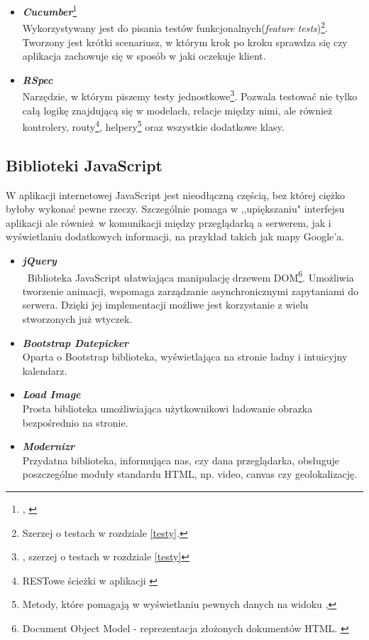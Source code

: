     \begin{itemize}
      \item \textbf{\emph{Cucumber}}\footnote{\cite{cucumber}, \cite{testing_tuesday} } \\
      Wykorzystywany jest do pisania testów funkcjonalnych(\emph{feature tests})\footnote{Szerzej o testach w rozdziale \ref{testy}.}. Tworzony jest krótki scenariusz, w którym krok po kroku sprawdza się czy aplikacja zachowuje się w sposób w jaki oczekuje klient.
      \item \textbf{\emph{RSpec}} \\
      Narzędzie, w którym piszemy testy jednostkowe\footnote{\cite{rspec}, szerzej o testach w rozdziale \ref{testy}}. Pozwala testować nie tylko całą logikę znajdującą się w modelach, relacje między nimi, ale również kontrolery, routy\footnote{RESTowe ścieżki w aplikacji \cite{head_first}}, helpery\footnote{Metody, które pomagają w wyświetlaniu pewnych danych na widoku \cite{rspec},\cite{rails_guide}} oraz wszystkie dodatkowe klasy. 
    \end{itemize}

  \subsection{Biblioteki JavaScript}
    W aplikacji internetowej JavaScript\cite{java_script} jest nieodłączną częścią, bez której ciężko byłoby wykonać pewne rzeczy. Szczególnie pomaga w ,,upiększaniu" interfejsu aplikacji ale również w komunikacji między przeglądarką a serwerem, jak i wyświetlaniu dodatkowych informacji, na przykład takich jak mapy Google'a.

    \begin{itemize}
      \item \textbf{\emph{jQuery}} \\ \
      Biblioteka JavaScript ułatwiająca manipulację drzewem DOM\footnote{Document Object Model - reprezentacja złożonych dokumentów HTML. \cite{html5_css3}}. Umożliwia tworzenie animacji, wspomaga zarządzanie asynchronicznymi zapytaniami do serwera. Dzięki jej implementacji możliwe jest korzystanie z wielu stworzonych już wtyczek.
      \item \textbf{\emph{Bootstrap Datepicker}} \\
      Oparta o Bootstrap biblioteka, wyświetlająca na stronie ładny i intuicyjny kalendarz.
      \item \textbf{\emph{Load Image}} \\
      Prosta biblioteka umożliwiająca użytkownikowi ładowanie obrazka bezpośrednio na stronie.
      \item \textbf{\emph{Modernizr}} \\
      Przydatna biblioteka, informująca nas, czy dana przeglądarka, obsługuje poszczególne moduły standardu HTML, np. video, canvas czy geolokalizację.
    \end{itemize}

